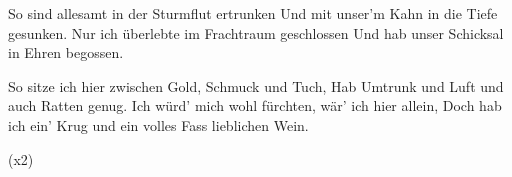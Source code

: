 \begin{guitar}
	So sind allesamt in der Sturmflut ertrunken
	Und mit unser'm Kahn in die Tiefe gesunken.
	Nur ich überlebte im Frachtraum geschlossen
	Und hab unser Schicksal in Ehren begossen.
	
	So sitze ich hier zwischen Gold, Schmuck und Tuch,
	Hab Umtrunk und Luft und auch Ratten genug.
	Ich würd' mich wohl fürchten, wär' ich hier allein,
	Doch hab ich ein' Krug und ein volles Fass lieblichen Wein.
	
	\begin{highlightbar}
		  (x2)%
	\end{highlightbar}
\end{guitar}

